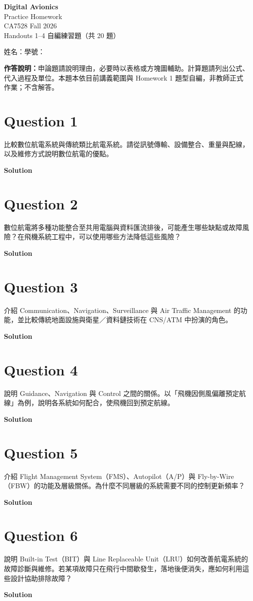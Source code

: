 \documentclass[12pt,a4paper]{article}
\newcommand{\question}[1]{\section*{Question #1}}
\newcommand{\solution}{\par\medskip\textbf{Solution}\par}
\begin{document}
\begin{center}
  {\LARGE\bfseries Digital Avionics}\\[0.3em]
  {\Large Practice Homework}\\[0.5em]
  CA7528 \quad Fall 2026\\[0.3em]
  Handouts 1--4 \quad 自編練習題（共 20 題）
\end{center}
\medskip
姓名：\underline{\hspace{3.4cm}}\hfill 學號：\underline{\hspace{3.4cm}}

\textbf{作答說明：}申論題請說明理由，必要時以表格或方塊圖輔助。計算題請列出公式、代入過程及單位。本題本依目前講義範圍與 Homework 1 題型自編，非教師正式作業；不含解答。

\question{1}
比較數位航電系統與傳統類比航電系統。請從訊號傳輸、設備整合、重量與配線，以及維修方式說明數位航電的優點。
\solution
\vfill
\question{2}
數位航電將多種功能整合至共用電腦與資料匯流排後，可能產生哪些缺點或故障風險？在飛機系統工程中，可以使用哪些方法降低這些風險？
\solution
\vfill
\newpage

\question{3}
介紹 Communication、Navigation、Surveillance 與 Air Traffic Management 的功能，並比較傳統地面設施與衛星／資料鏈技術在 CNS/ATM 中扮演的角色。
\solution
\vfill
\question{4}
說明 Guidance、Navigation 與 Control 之間的關係。以「飛機因側風偏離預定航線」為例，說明各系統如何配合，使飛機回到預定航線。
\solution
\vfill
\newpage

\question{5}
介紹 Flight Management System（FMS）、Autopilot（A/P）與 Fly-by-Wire（FBW）的功能及層級關係。為什麼不同層級的系統需要不同的控制更新頻率？
\solution
\vfill
\question{6}
說明 Built-in Test（BIT）與 Line Replaceable Unit（LRU）如何改善航電系統的故障診斷與維修。若某項故障只在飛行中間歇發生，落地後便消失，應如何利用這些設計協助排除故障？
\solution
\vfill
\newpage
\end{document}
